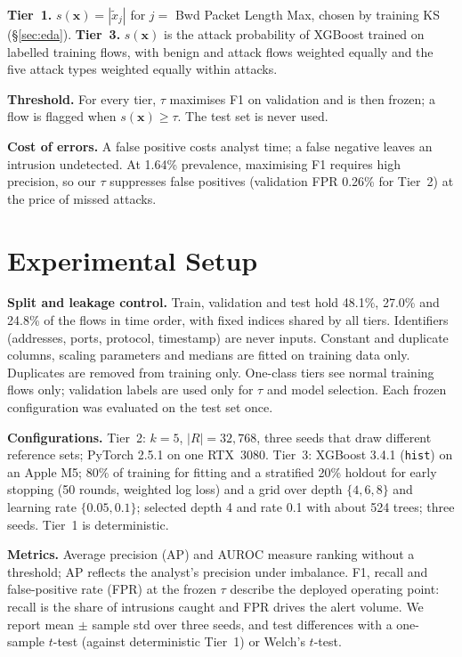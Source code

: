 \documentclass[11pt]{article}
\begin{document}
\textbf{Tier~1.} $s(\mathbf{x})=|\tilde{x}_j|$ for $j=$ Bwd Packet Length Max, chosen by training KS (\S\ref{sec:eda}). \textbf{Tier~3.} $s(\mathbf{x})$ is the attack probability of XGBoost trained on labelled training flows, with benign and attack flows weighted equally and the five attack types weighted equally within attacks.

\textbf{Threshold.} For every tier, $\tau$ maximises F1 on validation and is then frozen; a flow is flagged when $s(\mathbf{x})\ge\tau$. The test set is never used.

\textbf{Cost of errors.} A false positive costs analyst time; a false negative leaves an intrusion undetected. At 1.64\% prevalence, maximising F1 requires high precision, so our $\tau$ suppresses false positives (validation FPR 0.26\% for Tier~2) at the price of missed attacks.

\section{Experimental Setup}
\label{sec:setup}

\textbf{Split and leakage control.} Train, validation and test hold 48.1\%, 27.0\% and 24.8\% of the flows in time order, with fixed indices shared by all tiers. Identifiers (addresses, ports, protocol, timestamp) are never inputs. Constant and duplicate columns, scaling parameters and medians are fitted on training data only. Duplicates are removed from training only. One-class tiers see normal training flows only; validation labels are used only for $\tau$ and model selection. Each frozen configuration was evaluated on the test set once.

\textbf{Configurations.} Tier~2: $k=5$, $|R|=32{,}768$, three seeds that draw different reference sets; PyTorch 2.5.1 on one RTX~3080. Tier~3: XGBoost 3.4.1 (\texttt{hist}) on an Apple M5; 80\% of training for fitting and a stratified 20\% holdout for early stopping (50 rounds, weighted log loss) and a grid over depth $\{4,6,8\}$ and learning rate $\{0.05,0.1\}$; selected depth 4 and rate 0.1 with about 524 trees; three seeds. Tier~1 is deterministic.

\textbf{Metrics.} Average precision (AP) and AUROC measure ranking without a threshold; AP reflects the analyst's precision under imbalance. F1, recall and false-positive rate (FPR) at the frozen $\tau$ describe the deployed operating point: recall is the share of intrusions caught and FPR drives the alert volume. We report mean $\pm$ sample std over three seeds, and test differences with a one-sample $t$-test (against deterministic Tier~1) or Welch's $t$-test.
\end{document}
